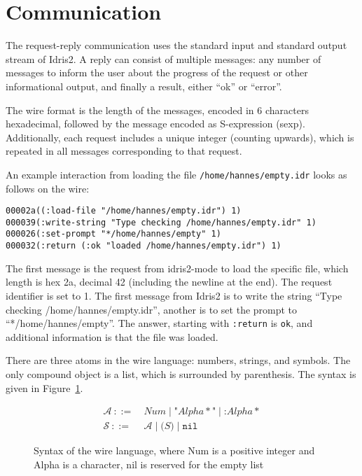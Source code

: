 \documentclass{article}
\begin{document}
\section{Communication}\label{sec:protocol}
The request-reply communication uses the standard input and standard output stream of Idris2.
A reply can consist of multiple messages: any number of messages to inform the user about the progress of the request or other informational output, and finally a result, either ``ok'' or ``error''.

The wire format is the length of the messages, encoded in 6 characters hexadecimal, followed by the message encoded as S-expression (sexp).
Additionally, each request includes a unique integer (counting upwards), which is repeated in all messages corresponding to that request.

An example interaction from loading the file \texttt{/home/hannes/empty.idr} looks as follows on the wire:
\begin{verbatim}
00002a((:load-file "/home/hannes/empty.idr") 1)
000039(:write-string "Type checking /home/hannes/empty.idr" 1)
000026(:set-prompt "*/home/hannes/empty" 1)
000032(:return (:ok "loaded /home/hannes/empty.idr") 1)
\end{verbatim}

The first message is the request from idris2-mode to load the specific file, which length is hex 2a, decimal 42 (including the newline at the end).
The request identifier is set to 1.
The first message from Idris2 is to write the string ``Type checking /home/hannes/empty.idr'', another is to set the prompt to ``*/home/hannes/empty''.
The answer, starting with \texttt{:return} is \texttt{ok}, and additional information is that the file was loaded.

There are three atoms in the wire language: numbers, strings, and symbols.
The only compound object is a list, which is surrounded by parenthesis.
The syntax is given in Figure~\ref{fig:syntax}.

\begin{figure}
\centering
\begin{align*}
\mathcal{A}{~::=~}&\mathit{Num} \mid \texttt{"} \mathit{Alpha*} \texttt{"} \mid \texttt{:}\mathit{Alpha*}\\
\mathcal{S}{~::=~}&\mathcal{A} \mid \texttt{(} S \texttt{)} \mid \texttt{nil}
\end{align*}
\caption{Syntax of the wire language, where Num is a positive integer and Alpha is a character, nil is reserved for the empty list}
\label{fig:syntax}
\end{figure}
\end{document}
